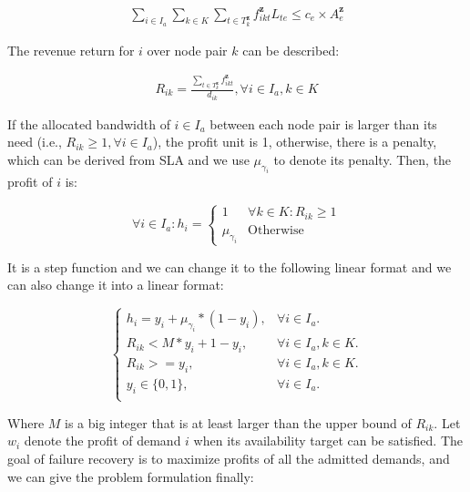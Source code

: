 \documentclass[sigconf]{acmart}
\begin{document}
\begin{small}
\begin{eqnarray} \label{B-constraint}
\sum_{i\in I_a}\sum_{k\in K}\sum_{t\in T^{ \bm{z}}_k} f^{ \bm{z}}_{ikt}L_{te} \le c_e \times A_e^{ \bm{z}}
\end{eqnarray}
\end{small}

The revenue return for $i$ over node pair $k$ can be described:
\begin{small}
\begin{eqnarray} \label{B-return}
R_{ik}=\frac{\sum_{t\in T^{ \bm{z}}_k} f^{ \bm{z}}_{ikt}}{d_{ik}}, \forall  i \in I_a,  k \in K
\end{eqnarray}
\end{small}


If the allocated bandwidth  of $i\in I_a$ between each node pair is larger than its need (i.e., $R_{ik} \ge 1, \forall i \in  I_a$), the profit unit is 1, 
otherwise, there is a penalty, which can be derived from SLA and we use $\mu_{\gamma_i}$ to denote its penalty.
Then, the profit of $i$ is:



\begin{equation}
\forall  i \in I_a : h_i=
\begin{cases}
1 &\text{$\forall k \in K: R_{ik} \ge 1 $}\\
\mu_{\gamma_i} &\text{Otherwise}
\end{cases}
\label{availability222}
\end{equation}

It is a step function and we can change it to the following linear format and we can also change it into a linear format:

\begin{equation}
\begin{cases}
h_i=y_i+\mu_{\gamma_i}*(1-y_i),&{\forall i \in I_a.} \\
R_{ik} < M*y_i+1-y_i,&{\forall i \in I_a,  k\in K.} \\
R_{ik} >= y_i,&{\forall i \in I_a,  k\in K.} \\
y_i \in\{0,1\},&{\forall i \in I_a.} \\
\end{cases}
\label{A-SSS2}
\end{equation}

Where $M$ is a big integer that is at least larger than the upper bound of $R_{ik}$.
Let $w_i$ denote the profit of demand $i$ when its availability target can be satisfied.
The goal of failure recovery is to maximize profits of all the admitted demands, and we can give the problem formulation finally:
\end{document}
